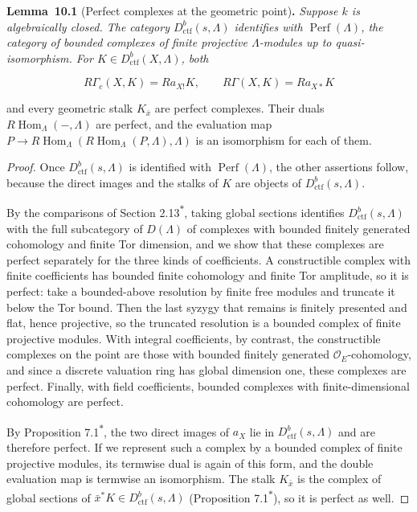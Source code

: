 \documentclass[11pt]{article}
\newenvironment{bpstatement}[2]{\par\addvspace{0.6\baselineskip}\noindent\textbf{#1}#2\textbf{.}\enspace\ignorespaces}
  {\par\addvspace{0.4\baselineskip}}
\newenvironment{bpstatementit}[2]{\begin{bpstatement}{#1}{#2}\itshape\ignorespaces}{\end{bpstatement}}
\newcommand{\bpout}[1]{#1\textsuperscript{\hyperlink{bp-outside}{\ensuremath{\ast}}}}
\begin{document}
\label{bp105}%
\begin{bpstatementit}{Lemma~10.1}{ (Perfect complexes at the geometric point)}
Suppose \(k\) is algebraically closed. The category \(D^b_{\mathrm{ctf}}(s,\Lambda)\) identifies with \(\operatorname{Perf}(\Lambda)\), the category of bounded complexes of finite projective \(\Lambda\)-modules up to quasi-isomorphism. For \(K\in D^b_{\mathrm{ctf}}(X,\Lambda)\), both

\[
R\Gamma_c(X,K)=Ra_{X!}K,\qquad R\Gamma(X,K)=Ra_{X*}K
\]

and every geometric stalk \(K_{\bar x}\) are perfect complexes. Their duals \(R\!\operatorname{Hom}_\Lambda(-,\Lambda)\) are perfect, and the evaluation map \(P\to R\!\operatorname{Hom}_\Lambda(R\!\operatorname{Hom}_\Lambda(P,\Lambda),
\Lambda)\) is an isomorphism for each of them.
\end{bpstatementit}

\begin{proof}[{Proof}]\label{bp106}%
Once \(D^b_{\mathrm{ctf}}(s,\Lambda)\) is identified with \(\operatorname{Perf}(\Lambda)\), the other assertions follow, because the direct images and the stalks of \(K\) are objects of \(D^b_{\mathrm{ctf}}(s,\Lambda)\).

By the comparisons of Section \bpout{2.13}, taking global sections identifies \(D^b_{\mathrm{ctf}}(s,\Lambda)\) with the full subcategory of \(D(\Lambda)\) of complexes with bounded finitely generated cohomology and finite Tor dimension, and we show that these complexes are perfect separately for the three kinds of coefficients. A constructible complex with finite coefficients has bounded finite cohomology and finite Tor amplitude, so it is perfect: take a bounded-above resolution by finite free modules and truncate it below the Tor bound. Then the last syzygy that remains is finitely presented and flat, hence projective, so the truncated resolution is a bounded complex of finite projective modules. With integral coefficients, by contrast, the constructible complexes on the point are those with bounded finitely generated \(\mathcal O_E\)-cohomology, and since a discrete valuation ring has global dimension one, these complexes are perfect. Finally, with field coefficients, bounded complexes with finite-dimensional cohomology are perfect.

By Proposition \bpout{7.1}, the two direct images of \(a_X\) lie in \(D^b_{\mathrm{ctf}}(s,\Lambda)\) and are therefore perfect. If we represent such a complex by a bounded complex of finite projective modules, its termwise dual is again of this form, and the double evaluation map is termwise an isomorphism. The stalk \(K_{\bar x}\) is the complex of global sections of \(\bar x^*K\in D^b_{\mathrm{ctf}}(s,\Lambda)\) (Proposition \bpout{7.1}), so it is perfect as well.
\end{proof}
\end{document}

